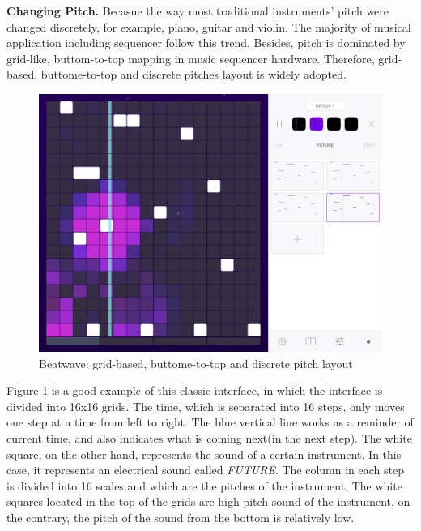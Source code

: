 \textbf{Changing Pitch.} Becasue the way most traditional instruments' pitch were changed discretely, for example, piano, guitar and violin. The majority of musical application including sequencer follow this trend. Besides, pitch is dominated by grid-like, buttom-to-top mapping in music sequencer hardware. Therefore, grid-based, buttome-to-top and discrete pitches layout is widely adopted.

\bigskip
\begin{figure}[h]
  \includegraphics[width=12 cm]{images/Beatwave.PNG}
  \centering
  \caption{Beatwave: grid-based, buttome-to-top and discrete pitch layout}
  \label{fig: Beatwave}
\end{figure}
\bigskip

 Figure \ref{fig: Beatwave} is a good example of this classic interface, in which the interface is divided into 16x16 grids. The time, which is separated into 16 steps, only moves one step at a time from left to right. The blue vertical line works as a reminder of current time, and also indicates what is coming next(in the next step). The white square, on the other hand, represents the sound of a certain instrument. In this case, it represents an electrical sound called \textit{FUTURE}. The column in each step is divided into 16 scales and which are the pitches of the instrument. The white squares located in the top of the grids are high pitch sound of the instrument, on the contrary, the pitch of the sound from the bottom is relatively low.

